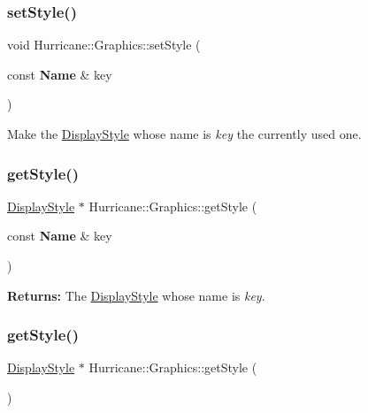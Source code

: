 \subsubsection{\texorpdfstring{set\+Style()}{setStyle()}}
{\footnotesize\ttfamily void Hurricane\+::\+Graphics\+::set\+Style (\begin{DoxyParamCaption}\item[{const \textbf{ Name} \&}]{key }\end{DoxyParamCaption})\hspace{0.3cm}{\ttfamily [static]}}

Make the \mbox{\hyperlink{classHurricane_1_1DisplayStyle}{Display\+Style}} whose name is {\itshape key} the currently used one. \mbox{\label{classHurricane_1_1Graphics_a2506213ff4c28b22d356e7bfbb242ed6}} 
\subsubsection{\texorpdfstring{get\+Style()}{getStyle()}\hspace{0.1cm}{\footnotesize\ttfamily [1/2]}}
{\footnotesize\ttfamily \mbox{\hyperlink{classHurricane_1_1DisplayStyle}{Display\+Style}} $\ast$ Hurricane\+::\+Graphics\+::get\+Style (\begin{DoxyParamCaption}\item[{const \textbf{ Name} \&}]{key }\end{DoxyParamCaption})\hspace{0.3cm}{\ttfamily [static]}}

{\bfseries Returns\+:} The \mbox{\hyperlink{classHurricane_1_1DisplayStyle}{Display\+Style}} whose name is {\itshape key}. \mbox{\label{classHurricane_1_1Graphics_aef89b1aa2be83b61ae0838a219d2b696}} 
\subsubsection{\texorpdfstring{get\+Style()}{getStyle()}\hspace{0.1cm}{\footnotesize\ttfamily [2/2]}}
{\footnotesize\ttfamily \mbox{\hyperlink{classHurricane_1_1DisplayStyle}{Display\+Style}} $\ast$ Hurricane\+::\+Graphics\+::get\+Style (\begin{DoxyParamCaption}{ }\end{DoxyParamCaption})\hspace{0.3cm}{\ttfamily [static]}}

